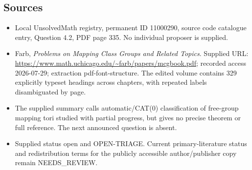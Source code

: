 \documentclass[11pt]{article}
\begin{document}
\subsection{Sources}
\begin{itemize}
\item Local UnsolvedMath registry, permanent ID 11000290, source code catalogue entry, Question 4.2, PDF page 335. No individual proposer is supplied.
\item Farb, \emph{Problems on Mapping Class Groups and Related Topics}. Supplied URL: \url{https://www.math.uchicago.edu/~farb/papers/mcgbook.pdf}; recorded access 2026-07-29; extraction pdf-font-structure. The edited volume contains 329 explicitly typeset headings across chapters, with repeated labels disambiguated by page.
\item The supplied summary calls automatic/CAT(0) classification of free-group mapping tori studied with partial progress, but gives no precise theorem or full reference. The next announced question is absent.
\item Supplied status open and OPEN-TRIAGE. Current primary-literature status and redistribution terms for the publicly accessible author/publisher copy remain NEEDS\_REVIEW.
\end{itemize}
\end{document}

